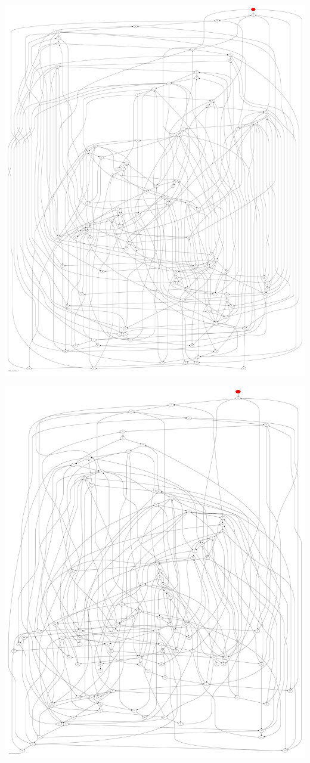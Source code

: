 \documentclass{article}
\begin{document}
\newpage
\includegraphics[max height=\textheight,max width=\textwidth]{bl_looming_objs/bl_loom_obj5_pp.pdf}

\newpage
\includegraphics[max height=\textheight,max width=\textwidth]{bl_looming_objs/bl_loom_obj6_pp.pdf}
\end{document}
